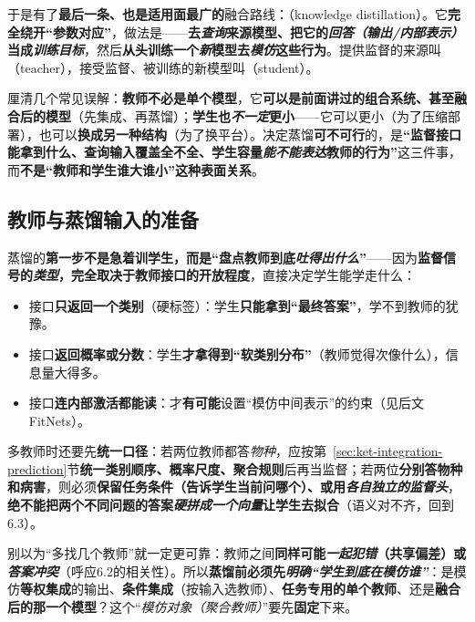 于是有了\textbf{最后一条、也是适用面最广的}融合路线：（knowledge distillation）。它\textbf{完全绕开“参数对应”}，做法是——\textbf{去\emph{查询}来源模型、把它的\emph{回答（输出/内部表示）}当成\emph{训练目标}}，然后\textbf{从头训练一个\emph{新}模型去\emph{模仿}这些行为}。提供监督的来源叫（teacher），接受监督、被训练的新模型叫（student）。

厘清几个常见误解：\textbf{教师不必是单个模型}，它\textbf{可以是前面讲过的组合系统、甚至融合后的模型}（先集成、再蒸馏）；\textbf{学生也\emph{不一定}更小}——它可以更小（为了压缩部署），也可以\textbf{换成另一种结构}（为了换平台）。决定蒸馏\textbf{可不可行}的，是\textbf{“监督接口能拿到什么、查询输入覆盖全不全、学生容量\emph{能不能表达}教师的行为”}这三件事，而\textbf{不是“教师和学生谁大谁小”这种表面关系}。

\subsection{教师与蒸馏输入的准备}
\label{sec:ket-integration-teachers-inputs}

蒸馏的\textbf{第一步不是急着训学生，而是“盘点教师到底\emph{吐得出什么}”}——因为\textbf{监督信号的\emph{类型}，完全取决于教师接口的开放程度}，直接决定学生能学走什么：
\begin{itemize}\item 接口\textbf{只返回一个类别}（硬标签）：学生\textbf{只能拿到“最终答案”}，学不到教师的犹豫。\item 接口\textbf{返回概率或分数}：学生\textbf{才拿得到“软类别分布”}（教师觉得次像什么），信息量大得多。\item 接口\textbf{连内部激活都能读}：才\textbf{有可能}设置“模仿中间表示”的约束（见后文FitNets）。\end{itemize}
多教师时还要先\textbf{统一口径}：若两位教师都答\emph{物种}，应按第~\ref{sec:ket-integration-prediction}节\textbf{统一类别顺序、概率尺度、聚合规则}后再当监督；若两位\textbf{分别答物种和病害}，则必须\textbf{保留任务条件（告诉学生当前问哪个）、或用\emph{各自独立的监督头}}，\textbf{绝不能把两个不同问题的答案\emph{硬拼成一个向量}让学生去拟合}（语义对不齐，回到6.3）。

别以为“多找几个教师”就一定更可靠：教师之间\textbf{同样可能\emph{一起犯错}（共享偏差）或\emph{答案冲突}}（呼应6.2的相关性）。所以\textbf{蒸馏前必须先\emph{明确“学生到底在模仿谁”}}：是模仿\textbf{等权集成}的输出、\textbf{条件集成}（按输入选教师）、\textbf{任务专用的单个教师}、还是\textbf{融合后的那一个模型}？这个“\emph{模仿对象（聚合教师）}”要先\textbf{固定}下来。

